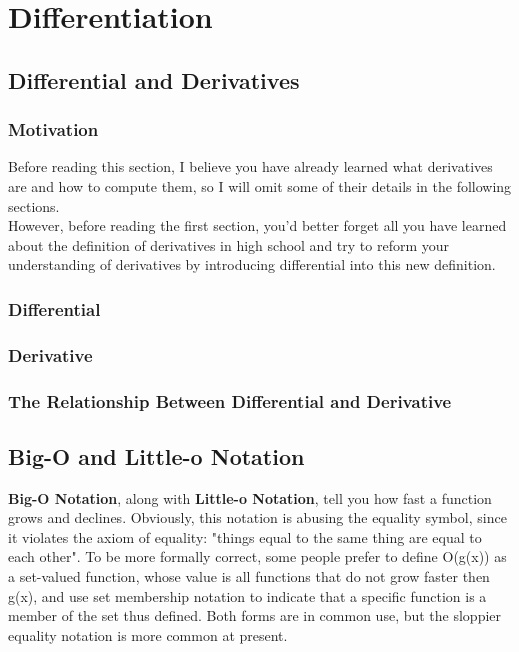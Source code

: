\chapter{Differentiation}
\section{Differential and Derivatives}
\subsection{Motivation}
\noindent Before reading this section, I believe you have already learned what derivatives are and how to compute them, so I will omit some of their details in the following sections.
\\ However, before reading the first section, you'd better forget all you have learned about the definition of derivatives in high school and try to reform your understanding of derivatives by introducing differential into this new definition.

\subsection{Differential}

\subsection{Derivative}

\subsection{The Relationship Between Differential and Derivative}


\section{Big-O and Little-o Notation}
\textbf{Big-O Notation}, along with \textbf{Little-o Notation}, tell you how fast a function grows and declines. Obviously, this notation is abusing the equality symbol, since it violates the axiom of equality: "things equal to the same thing are equal to each other". To be more formally correct, some people prefer to define O(g(x)) as a set-valued function, whose value is all functions that do not grow
faster then g(x), and use set membership notation to indicate that a specific function is a member of the set thus defined. Both forms are in common use, but the sloppier equality notation is more common at present.

